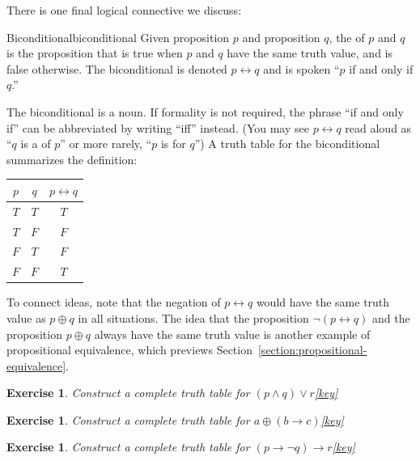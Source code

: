 \documentclass{book}
\newcounter{ekcounter}%
\theoremstyle{ekimcustom}
\newtheorem{exercise}[ekcounter]{Exercise}
\newcommand\defn[1]{{\color{blue}{\bf #1}}}
\begin{document}
There is one final logical connective we discuss:
\begin{bdefinition}{Biconditional}{biconditional}
Given proposition $p$ and proposition $q$, the \defn{biconditional} of $p$ and $q$ is the proposition that is true when $p$ and $q$ have the same truth value, and is false otherwise. The biconditional is denoted $p \leftrightarrow q$ and is spoken ``$p$ if and only if $q$.''
\end{bdefinition}
The biconditional is a noun. If formality is not required, the phrase ``if and only if'' can be abbreviated by writing ``iff'' instead. (You may see $p \leftrightarrow q$ read aloud as ``$q$ is a \defn{characterization} of $p$'' or more rarely, ``$p$ is \defn{necessary and sufficient} for $q$'') A truth table for the biconditional summarizes the definition:
\begin{center}
\begin{tabular}{c|c||c}
$p$ & $q$ & $p \leftrightarrow q$ \\\hline
$T$ & $T$ & $T$\\
$T$ & $F$ & $F$\\
$F$ & $T$ & $F$\\
$F$ & $F$ & $T$
\end{tabular}
\end{center}
To connect ideas, note that the negation of $p \leftrightarrow q$ would have the same truth value as $p \oplus q$ in all situations. The idea that the proposition $\neg (p \leftrightarrow q)$ and the proposition $p \oplus q$ always have the same truth value is another example of propositional equivalence, which previews Section~\ref{section:propositional-equivalence}.

\begin{exercise}
Construct a complete truth table for $(p \wedge q) \vee r$\quad\quad\href{https://www.sharelatex.com/project/59b5ce3ae3f68865abb45367}{{\color{red}[key]}}
\end{exercise}

\begin{exercise}
Construct a complete truth table for $a \oplus (b \rightarrow c)$\quad\quad\href{https://www.sharelatex.com/project/59b5cf30e3f68865abb45397}{{\color{red}[key]}}
\end{exercise}

\begin{exercise}
Construct a complete truth table for $(p \rightarrow \neg q) \rightarrow r$\quad\quad\href{https://www.sharelatex.com/project/59b677f7f27111267188d25b}{{\color{red}[key]}}
\end{exercise}
\end{document}
